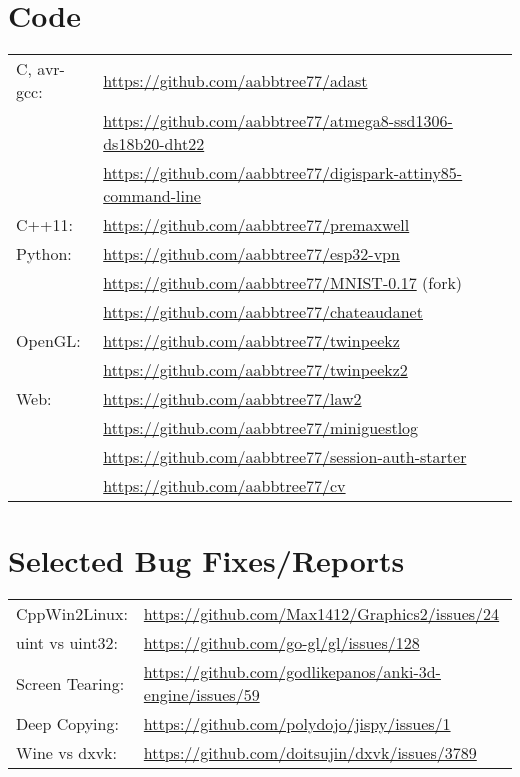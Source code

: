 \documentclass[a4paper,11pt]{article}
\begin{document}
\section{Code}
\begin{tabular}{ll}
C, avr-gcc: & \url{https://github.com/aabbtree77/adast}\\
& \url{https://github.com/aabbtree77/atmega8-ssd1306-ds18b20-dht22}\\
& \url{https://github.com/aabbtree77/digispark-attiny85-command-line}\\
C++11: & \url{https://github.com/aabbtree77/premaxwell}\\
Python: & \url{https://github.com/aabbtree77/esp32-vpn}\\
& \url{https://github.com/aabbtree77/MNIST-0.17} (fork)\\
& \url{https://github.com/aabbtree77/chateaudanet}\\
OpenGL:  & \url{https://github.com/aabbtree77/twinpeekz}\\
         & \url{https://github.com/aabbtree77/twinpeekz2}\\
Web:  & \url{https://github.com/aabbtree77/law2}\\
         & \url{https://github.com/aabbtree77/miniguestlog}\\
         & \url{https://github.com/aabbtree77/session-auth-starter}\\
         & \url{https://github.com/aabbtree77/cv}\\         
\end{tabular}
%
\section{Selected Bug Fixes/Reports}
\begin{tabular}{ll}
CppWin2Linux: & \url{https://github.com/Max1412/Graphics2/issues/24}\\
uint vs uint32: & \url{https://github.com/go-gl/gl/issues/128}\\
Screen Tearing: & \url{https://github.com/godlikepanos/anki-3d-engine/issues/59}\\
Deep Copying: & \url{https://github.com/polydojo/jispy/issues/1}\\
Wine vs dxvk: & \url{https://github.com/doitsujin/dxvk/issues/3789}
\end{tabular}
%
\end{document}
